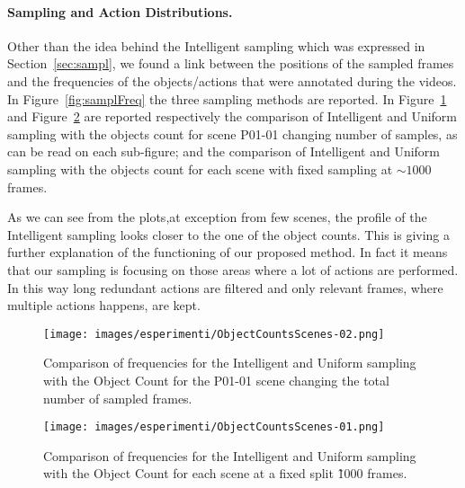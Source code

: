 \paragraph{Sampling and Action Distributions. } Other than the idea behind the Intelligent sampling which was expressed in Section~\ref{sec:sampl}, we found a
link between the positions of the sampled frames and the frequencies of the objects/actions that were annotated during the videos.
In Figure~\ref{fig:samplFreq} the three sampling methods are reported. 
In Figure~\ref{fig:objectP01_01} and Figure~\ref{fig:objectsScenes} are reported respectively
the comparison of Intelligent and Uniform sampling with the objects count for scene P01-01 changing number of samples,
as can be read on each sub-figure; and the comparison of Intelligent and Uniform sampling with the objects count for each scene
with fixed sampling at $\sim1000$ frames.
 
As we can see from the plots,at exception from few scenes, the profile of the Intelligent sampling looks closer
to the one of the object counts. This is giving a further explanation of the functioning of our proposed method.
In fact it means that our sampling is focusing on those areas where a lot of actions are performed. In this way
long redundant actions are filtered and only relevant frames, where multiple actions happens, are kept. 

\begin{figure}[H]
    \centering
    \texttt{[image: images/esperimenti/ObjectCountsScenes-02.png]} 
    \caption{Comparison of frequencies for the Intelligent and Uniform sampling with the Object Count for the P01-01 scene changing the total
    number of sampled frames.}\label{fig:objectP01_01}
\end{figure}

\begin{figure}[H]
    \centering
    \texttt{[image: images/esperimenti/ObjectCountsScenes-01.png]} 
    \caption{Comparison of frequencies for the Intelligent and Uniform sampling with the Object Count for each scene at a fixed split \~1000 frames.}\label{fig:objectsScenes}
\end{figure}

